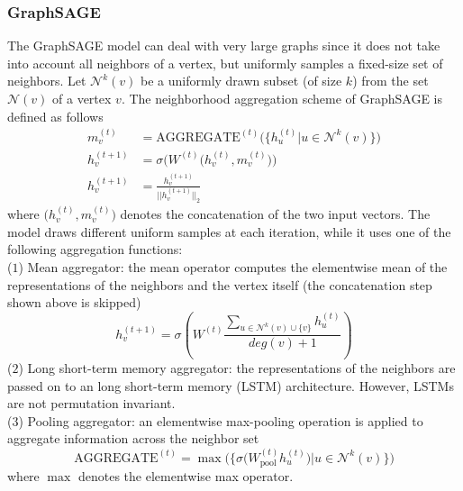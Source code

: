 \documentclass[twoside,11pt]{article}
\begin{document}
\subsubsection{GraphSAGE}
The GraphSAGE  model can deal with very large graphs since it does not take into account all neighbors of a vertex, but uniformly samples a fixed-size set of neighbors.
Let $\mathcal{N}^k(v)$ be a uniformly drawn subset (of size $k$) from the set $\mathcal{N}(v)$ of a vertex $v$.
The neighborhood aggregation scheme of GraphSAGE is defined as follows
\begin{equation}
  \begin{split}
      m_v^{(t)} &= \text{AGGREGATE}^{(t)}\Big( \Big\{h_u^{(t)} \big| u \in \mathcal{N}^k(v) \Big\} \Big) \\
      h_v^{(t+1)} &= \sigma \Big( W^{(t)} \big( h_v^{(t)} , m_v^{(t)} \big)\Big) \\
      h_v^{(t+1)} &= \frac{h_v^{(t+1)}}{\big|\big|h_v^{(t+1)}\big|\big|_2}
  \end{split}
\end{equation}
where $\big( h_v^{(t)} , m_v^{(t)} \big)$ denotes the concatenation of the two input vectors.
The model draws different uniform samples at each iteration, while it uses one of the following aggregation functions:\\
\noindent($1$) Mean aggregator: the mean operator computes the elementwise mean of the representations of the neighbors and the vertex itself (the concatenation step shown above is skipped)
\begin{equation}
  h_v^{(t+1)} = \sigma \left( W^{(t)} \frac{\sum_{u \in \mathcal{N}^k(v) \cup \{v\}}h_u^{(t)}}{deg(v)+1} \right)
\end{equation}
\noindent($2$) Long short-term memory aggregator: the representations of the neighbors are passed on to an long short-term memory (LSTM) architecture.
However, LSTMs are not permutation invariant.\\
\noindent($3$) Pooling aggregator: an elementwise max-pooling operation is applied to aggregate information across the neighbor set
\begin{equation}
  \text{AGGREGATE}^{(t)} = \max \Big( \Big\{ \sigma \big(W_{\text{pool}}^{(t)} h_u^{(t)} \big) \big| u \in \mathcal{N}^k(v) \Big\} \Big)
\end{equation}
where $\max$ denotes the elementwise max operator.
\end{document}
